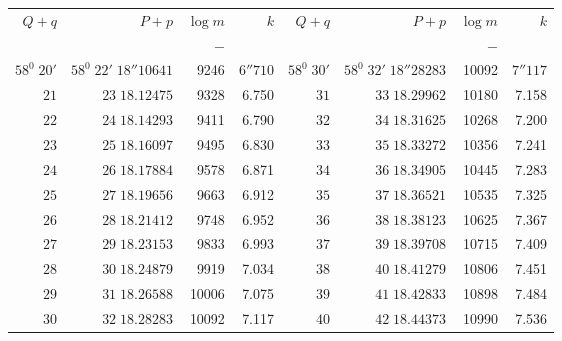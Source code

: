 \clearpage
{}
\begingroup
\fontsize{8}{9}\selectfont
\setlength{\tabcolsep}{3pt}
\renewcommand{\arraystretch}{1.08}
\begin{center}
\begin{tabular}{|r|r|r|r||r|r|r|r|}
\hline
\(Q+q\)&\(P+p\)&\(\log m\)&\(k\)&\(Q+q\)&\(P+p\)&\(\log m\)&\(k\)\\
&&\(-\)&&&&\(-\)&\\\hline
\(58^0\;20'\)&\(58^0\;22'\;18''10641\)&9246&\(6''710\)&\(58^0\;30'\)&\(58^0\;32'\;18''28283\)&10092&\(7''117\)\\
\(21\)&\(23\;18.12475\)&9328&6.750&\(31\)&\(33\;18.29962\)&10180&7.158\\
\(22\)&\(24\;18.14293\)&9411&6.790&\(32\)&\(34\;18.31625\)&10268&7.200\\
\(23\)&\(25\;18.16097\)&9495&6.830&\(33\)&\(35\;18.33272\)&10356&7.241\\
\(24\)&\(26\;18.17884\)&9578&6.871&\(34\)&\(36\;18.34905\)&10445&7.283\\
\(25\)&\(27\;18.19656\)&9663&6.912&\(35\)&\(37\;18.36521\)&10535&7.325\\
\(26\)&\(28\;18.21412\)&9748&6.952&\(36\)&\(38\;18.38123\)&10625&7.367\\
\(27\)&\(29\;18.23153\)&9833&6.993&\(37\)&\(39\;18.39708\)&10715&7.409\\
\(28\)&\(30\;18.24879\)&9919&7.034&\(38\)&\(40\;18.41279\)&10806&7.451\\
\(29\)&\(31\;18.26588\)&10006&7.075&\(39\)&\(41\;18.42833\)&10898&7.484\\
\(30\)&\(32\;18.28283\)&10092&7.117&\(40\)&\(42\;18.44373\)&10990&7.536\\
\hline
\end{tabular}
\end{center}
\endgroup
